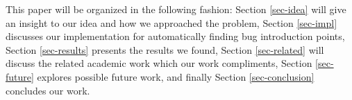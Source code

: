{This paper will be organized in the following fashion: Section
\ref{sec-idea} will give an insight to our idea and how we approached
the problem, Section \ref{sec-impl} discusses our implementation for
automatically finding bug introduction points, Section
\ref{sec-results} presents the results we found, Section
\ref{sec-related} will discuss the related academic work which our
work compliments, Section \ref{sec-future} explores possible future
work, and finally Section \ref{sec-conclusion} concludes our work.
}
